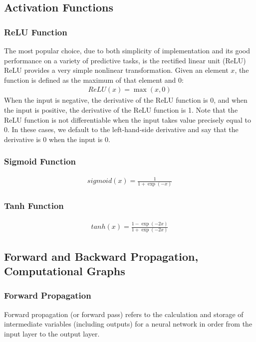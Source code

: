\documentclass[a4paper,12pt]{article}
\theoremstyle{definition}
\begin{document}
\subsection*{Activation Functions}
\subsubsection*{ReLU Function}
The most popular choice, due to both simplicity of implementation and its good performance on a variety of predictive tasks, is the rectified linear unit (ReLU)
ReLU provides a very simple nonlinear transformation. Given an element $x$, the function is defined as the maximum of that element and 0:
\begin{equation*}
    \begin{aligned}
        ReLU(x) = \max(x,0)
    \end{aligned}
\end{equation*}
When the input is negative, the derivative of the ReLU function is 0, and when the input is positive, the derivative of the ReLU function is 1. Note that the ReLU
function is not differentiable when the input takes value precisely equal to 0. In these cases, we default to the left-hand-side derivative and say that the derivative
is 0 when the input is 0.
\subsubsection*{Sigmoid Function}
\begin{equation*}
    \begin{aligned}
        sigmoid(x) = \frac{1}{1+\exp(-x)}
    \end{aligned}
\end{equation*}
\subsubsection*{Tanh Function}
\begin{equation*}
    \begin{aligned}
        tanh(x) = \frac{1-\exp(-2x)}{1+\exp(-2x)}
    \end{aligned}
\end{equation*}

\subsection*{Forward and Backward Propagation, Computational Graphs}
\subsubsection*{Forward Propagation}
Forward propagation (or forward pass) refers to the calculation and storage of intermediate variables (including outputs) for a neural network in order from
the input layer to the output layer.
\end{document}
